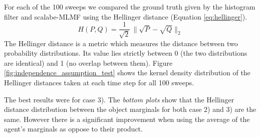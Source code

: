 For each of the 100 sweeps we compared the ground truth given by the histogram filter and scalabe-MLMF using the Hellinger distance (Equation \ref{eq:hellinger}).
\begin{equation} \label{eq:hellinger}
 H(P,Q) = \frac{1}{\sqrt{2}}\, \|\sqrt{P} - \sqrt{Q}\|_2  
\end{equation}
The Hellinger distance is a metric which measures the distance between two probability distributions. Its value lies strictly between 0 (the two 
distributions are identical) and 1 (no overlap between them). Figure \ref{fig:independence_assumption_test} shows the kernel density 
distribution of the Hellinger distances taken at each time step for all 100 sweeps.

The best results were for case 3). The \textit{bottom plots} show that the Hellinger distance distribution between the
object marginals for both case 2) and 3) are the same. However there is a significant improvement when using the average of the agent's marginals as oppose to 
their product. 

